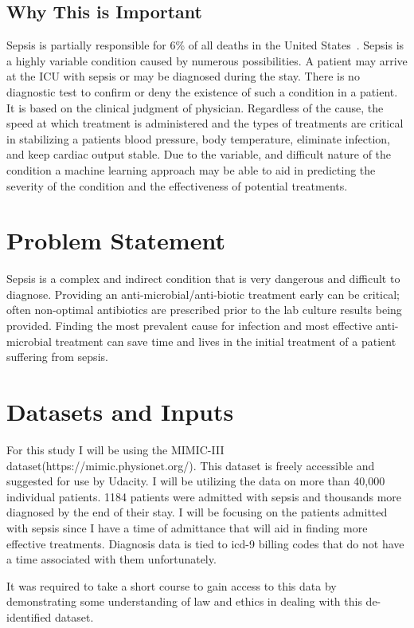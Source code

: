 \documentclass[11pt]{article}
\begin{document}
\subsection{Why This is Important}

Sepsis is partially responsible for 6\% of all deaths in the United States~\cite{cdc}. Sepsis is a highly variable condition caused by numerous possibilities. A patient may arrive at the ICU with sepsis or may be diagnosed during the stay. There is no diagnostic test to confirm or deny the existence of such a condition in a patient. It is based on the clinical judgment of physician. Regardless of the cause, the speed at which treatment is administered and the types of treatments are critical in stabilizing a patients blood pressure, body temperature, eliminate infection, and keep cardiac output stable. Due to the variable, and difficult nature of the condition a machine learning approach may be able to aid in predicting the severity of the condition and the effectiveness of potential treatments.


\section{Problem Statement}
Sepsis is a complex and indirect condition that is very dangerous and difficult to diagnose. Providing an anti-microbial/anti-biotic treatment early can be critical; often non-optimal antibiotics are prescribed prior to the lab culture results being provided. Finding the most prevalent cause for infection and most effective anti-microbial treatment can save time and lives in the initial treatment of a patient suffering from sepsis.
\section{Datasets and Inputs}
For this study I will be using the MIMIC-III dataset(https://mimic.physionet.org/). This dataset is freely accessible and suggested for use by Udacity. I will be utilizing the data on more than 40,000 individual patients. 1184 patients were admitted with sepsis and thousands more diagnosed by the end of their stay. I will be focusing on the patients admitted with sepsis since I have a time of admittance that will aid in finding more effective treatments. Diagnosis data is tied to icd-9 billing codes that do not have a time associated with them unfortunately.

It was required to take a short course to gain access to this data by demonstrating some understanding of law and ethics in dealing with this de-identified dataset.
\end{document}
